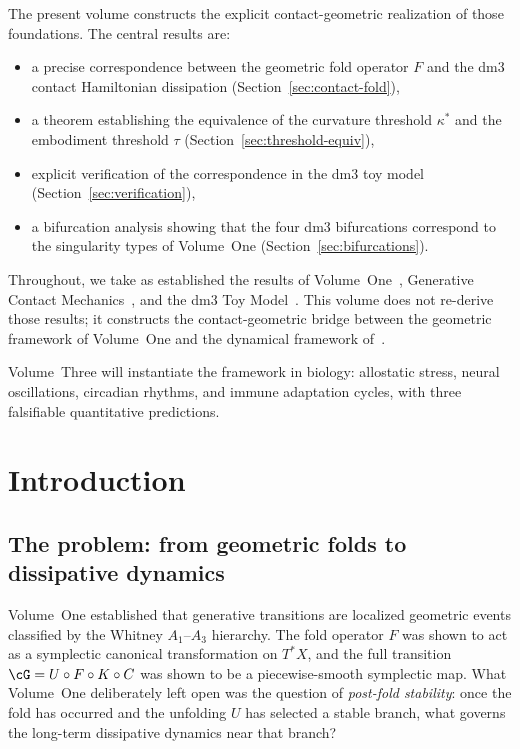 \documentclass[12pt, oneside]{book}
\theoremstyle{plain}
\theoremstyle{definition}
\theoremstyle{remark}
\begin{document}
The present volume constructs the explicit contact-geometric
realization of those foundations. The central results are:
\begin{itemize}[leftmargin=*]
  \item a precise correspondence between the geometric fold operator
        $F$ and the dm3 contact Hamiltonian dissipation
        (Section~\ref{sec:contact-fold}),
  \item a theorem establishing the equivalence of the curvature
        threshold $\kappa^*$ and the embodiment threshold $\tau$
        (Section~\ref{sec:threshold-equiv}),
  \item explicit verification of the correspondence in the dm3 toy
        model (Section~\ref{sec:verification}),
  \item a bifurcation analysis showing that the four dm3 bifurcations
        correspond to the singularity types of Volume~One
        (Section~\ref{sec:bifurcations}).
\end{itemize}

Throughout, we take as established the results of
Volume~One~\cite{PO1}, Generative Contact Mechanics~\cite{Paper1},
and the dm3 Toy Model~\cite{Paper2}. This volume does not re-derive
those results; it constructs the contact-geometric bridge between
the geometric framework of Volume~One and the dynamical framework
of~\cite{Paper1,Paper2}.

Volume~Three will instantiate the framework in biology:
allostatic stress, neural oscillations, circadian rhythms,
and immune adaptation cycles, with three falsifiable quantitative
predictions.

\section{Introduction}
\label{sec:intro}

\subsection{The problem: from geometric folds to dissipative dynamics}

Volume~One established that generative transitions are localized
geometric events classified by the Whitney $A_1$--$A_3$ hierarchy.
The fold operator $F$ was shown to act as a symplectic canonical
transformation on $T^*X$, and the full transition
$\cG = U\circ F\circ K\circ C$ was shown to be a piecewise-smooth
symplectic map. What Volume~One deliberately left open was the
question of \emph{post-fold stability}: once the fold has occurred
and the unfolding $U$ has selected a stable branch, what governs
the long-term dissipative dynamics near that branch?
\end{document}
